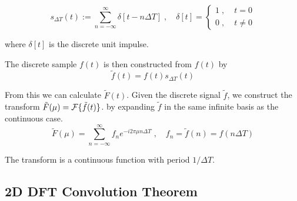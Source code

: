 \begin{equation} \label{1D-sampling-function}
s_{\Delta T}(t) := \sum_{n=-\infty}^{\infty} \delta[t - n\Delta T] \;,\quad
\delta[t] = \begin{cases} 1 \;,\; & t=0 \\ 0 \;,\;& t \ne 0 \end{cases}
\end{equation}

where $\delta[t]$ is the discrete unit impulse.

The discrete sample $f(t)$ is then constructed from $f(t)$ by
\begin{equation} \label{1D-discrete-sample}
\tilde{f}(t) = f(t) s_{\Delta T}(t)
\end{equation}

From this we can calculate $\tilde{F}(t)$.
Given the discrete signal $\tilde{f}$, we construct the transform
$\tilde{F}(\mu) = \operatorname{\mathcal{F}}\{\tilde{f}(t)\}$. by expanding $\tilde{f}$ in the same infinite basis as the continuous case.
\begin{equation} \label{1D-DFT-transform}
\tilde{F}(\mu) = \sum_{n=-\infty}^{\infty} f_n e^{-i 2\pi \mu n \Delta T} \;,\quad
f_n = \tilde{f}(n) = f(n\Delta T)
\end{equation}

The transform is a continuous function with period $1 / \Delta T$. 


\subsection{2D DFT Convolution Theorem}

